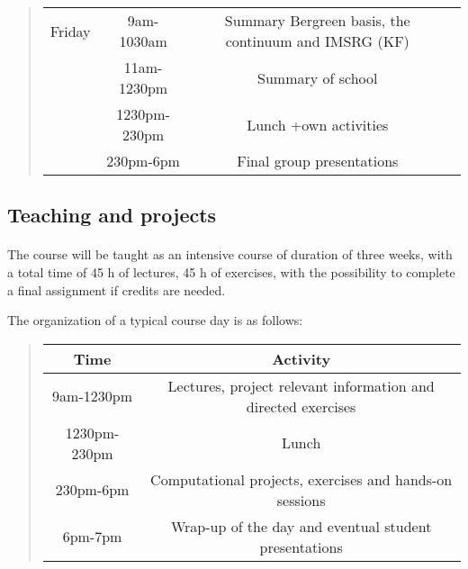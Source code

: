 \documentclass[%
oneside,                 %
final,                   %
10pt]{article}
\begin{document}
\begin{quote}
\begin{tabular}{cccc}
\hline
Friday    & 9am-1030am   & Summary Bergreen basis, the continuum and IMSRG (KF) &                                                              \\
          & 11am-1230pm  & Summary of school                                    &                                                              \\
          & 1230pm-230pm & Lunch +own activities                                &                                                              \\
          & 230pm-6pm    & Final group presentations                            &                                                              \\
\hline
\end{tabular}
\end{quote}

\noindent




\subsection*{Teaching and projects}

\paragraph{}

The course will be taught as an intensive  course of duration of three weeks, with a
total time of 45 h of lectures, 45 h of exercises, with the possibility to complete a final assignment if credits are needed.

The organization of a typical course day is as follows:


\begin{quote}
\begin{tabular}{cc}
\hline
\multicolumn{1}{c}{ Time } & \multicolumn{1}{c}{ Activity } \\
\hline
9am-1230pm   & Lectures, project relevant information and directed exercises \\
1230pm-230pm & Lunch                                                         \\
230pm-6pm    & Computational projects, exercises  and hands-on sessions      \\
6pm-7pm      & Wrap-up of the day and eventual student presentations         \\
\hline
\end{tabular}
\end{quote}
\end{document}
